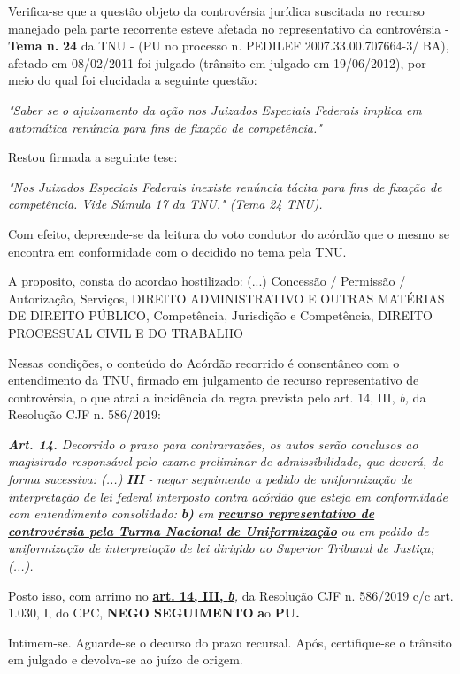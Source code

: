 \documentclass[12pt]{article}
\begin{document}
\justifying
\noindent Verifica-se que a questão objeto da controvérsia jurídica suscitada no recurso manejado pela parte recorrente esteve afetada no representativo da controvérsia - \textbf{Tema n. }\textbf{24} da TNU - (PU no processo n. PEDILEF 2007.33.00.707664-3/ BA),  afetado em 08/02/2011 foi julgado (trânsito em julgado em 19/06/2012), por meio do qual foi elucidada a seguinte questão:

\noindent \textit{"Saber se o ajuizamento da ação nos Juizados Especiais Federais implica em automática renúncia para fins de fixação de competência."}

\noindent Restou firmada a seguinte tese:

\noindent \textit{"Nos Juizados Especiais Federais inexiste renúncia tácita para fins de fixação de competência. Vide Súmula 17 da TNU." (Tema 24 TNU).}

\noindent Com efeito, depreende-se da leitura do voto condutor do acórdão que o mesmo se encontra em conformidade com o decidido no  tema pela TNU.

\noindent A proposito, consta do acordao hostilizado: (...) Concessão / Permissão / Autorização, Serviços, DIREITO ADMINISTRATIVO E OUTRAS MATÉRIAS DE DIREITO PÚBLICO, Competência, Jurisdição e Competência, DIREITO PROCESSUAL CIVIL E DO TRABALHO

\noindent Nessas condições, o conteúdo do Acórdão recorrido é consentâneo com o entendimento da TNU, firmado em julgamento de recurso representativo de controvérsia, o que atrai a incidência da regra prevista pelo art. 14, III, \textit{b,} da Resolução CJF n. 586/2019:

\noindent \textit{\textbf{Art. 14.}}\textit{ Decorrido o prazo para contrarrazões, os autos serão conclusos ao magistrado responsável pelo exame preliminar de admissibilidade, que deverá, de forma sucessiva: (...) }\textit{\textbf{III }}\textit{- negar seguimento a pedido de uniformização de interpretação de lei federal interposto contra acórdão que esteja em conformidade com entendimento consolidado: }\textit{\textbf{b)}}\textit{ em }\uline{\textit{\textbf{recurso representativo de controvérsia pela Turma Nacional de Uniformização}}}\textit{ ou em pedido de uniformização de interpretação de lei dirigido ao Superior Tribunal de Justiça;(...).}

\noindent Posto isso, com arrimo no \uline{\textbf{art. 14, III, }}\uline{\textit{\textbf{b}}}\textit{,} da Resolução CJF n. 586/2019 c/c art. 1.030, I, do CPC, \textbf{NEGO SEGUIMENTO }\textbf{a}o\textbf{ PU}\textbf{.}

\noindent Intimem-se. Aguarde-se o decurso do prazo recursal. Após, certifique-se o trânsito em julgado e devolva-se ao juízo de origem.
\end{document}
